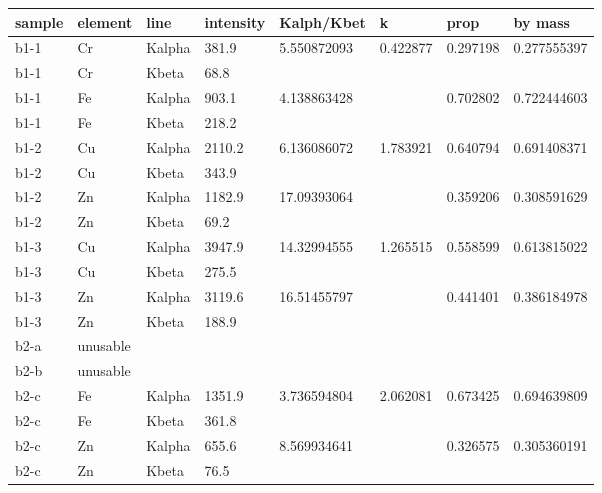 \documentclass[11pt,a4paper,twoside,onecolumn]{article}
\begin{document}
\begin{table}[htbp]
\centering
\begin{tabular}{@{}llllllll@{}}
\toprule
sample & element  & line   & intensity & Kalph/Kbet  & k        & prop     & by mass     \\ \midrule
b1-1   & Cr       & Kalpha & 381.9     & 5.550872093 & 0.422877 & 0.297198 & 0.277555397 \\
b1-1   & Cr       & Kbeta  & 68.8      &             &          &          &             \\
b1-1   & Fe       & Kalpha & 903.1     & 4.138863428 &          & 0.702802 & 0.722444603 \\
b1-1   & Fe       & Kbeta  & 218.2     &             &          &          &             \\ \midrule
b1-2   & Cu       & Kalpha & 2110.2    & 6.136086072 & 1.783921 & 0.640794 & 0.691408371 \\
b1-2   & Cu       & Kbeta  & 343.9     &             &          &          &             \\
b1-2   & Zn       & Kalpha & 1182.9    & 17.09393064 &          & 0.359206 & 0.308591629 \\
b1-2   & Zn       & Kbeta  & 69.2      &             &          &          &             \\ \midrule
b1-3   & Cu       & Kalpha & 3947.9    & 14.32994555 & 1.265515 & 0.558599 & 0.613815022 \\
b1-3   & Cu       & Kbeta  & 275.5     &             &          &          &             \\
b1-3   & Zn       & Kalpha & 3119.6    & 16.51455797 &          & 0.441401 & 0.386184978 \\
b1-3   & Zn       & Kbeta  & 188.9     &             &          &          &             \\ \midrule
b2-a   & unusable &        &           &             &          &          &             \\ \midrule
b2-b   & unusable &        &           &             &          &          &             \\ \midrule
b2-c   & Fe       & Kalpha & 1351.9    & 3.736594804 & 2.062081 & 0.673425 & 0.694639809 \\
b2-c   & Fe       & Kbeta  & 361.8     &             &          &          &             \\
b2-c   & Zn       & Kalpha & 655.6     & 8.569934641 &          & 0.326575 & 0.305360191 \\
b2-c   & Zn       & Kbeta  & 76.5      &             &          &          &             \\ \midrule

\end{tabular}
\end{table}
\end{document}
